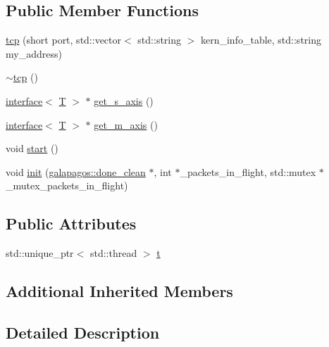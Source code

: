 \subsection*{Public Member Functions}
\begin{DoxyCompactItemize}
\item 
\hyperlink{classgalapagos_1_1net_1_1tcp_ad739afb4887a1af1388e901b951ede3a}{tcp} (short port, std\+::vector$<$ std\+::string $>$ kern\+\_\+info\+\_\+table, std\+::string my\+\_\+address)
\item 
\hyperlink{classgalapagos_1_1net_1_1tcp_a9908d7aea9bfaf39466706e53cf14437}{$\sim$tcp} ()
\item 
\hyperlink{classgalapagos_1_1interface}{interface}$<$ \hyperlink{test_8cpp_a0658ceffa730c765d449bb3d21871b5f}{T} $>$ $\ast$ \hyperlink{classgalapagos_1_1net_1_1tcp_ac9f3db01e1d6e9bf0bc7527fabf3543a}{get\+\_\+s\+\_\+axis} ()
\item 
\hyperlink{classgalapagos_1_1interface}{interface}$<$ \hyperlink{test_8cpp_a0658ceffa730c765d449bb3d21871b5f}{T} $>$ $\ast$ \hyperlink{classgalapagos_1_1net_1_1tcp_a47f42325519b0dda4c0157f1d897ed75}{get\+\_\+m\+\_\+axis} ()
\item 
void \hyperlink{classgalapagos_1_1net_1_1tcp_ad792d3c67e6e8a79cb18a6d0c4aaecda}{start} ()
\item 
void \hyperlink{classgalapagos_1_1net_1_1tcp_a10e2ca93acd1562162b2a49400be1292}{init} (\hyperlink{classgalapagos_1_1done__clean}{galapagos\+::done\+\_\+clean} $\ast$, int $\ast$\+\_\+packets\+\_\+in\+\_\+flight, std\+::mutex $\ast$\+\_\+mutex\+\_\+packets\+\_\+in\+\_\+flight)
\end{DoxyCompactItemize}
\subsection*{Public Attributes}
\begin{DoxyCompactItemize}
\item 
std\+::unique\+\_\+ptr$<$ std\+::thread $>$ \hyperlink{classgalapagos_1_1net_1_1tcp_a4820fa1fc2a4a396eaf0554042873643}{t}
\end{DoxyCompactItemize}
\subsection*{Additional Inherited Members}


\subsection{Detailed Description}
